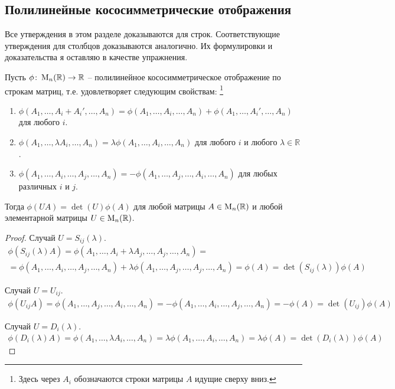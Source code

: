 \subsection{Полилинейные кососимметрические отображения}
\label{section::DetPolyLinear}

Все утверждения в этом разделе доказываются для строк.
Соответствующие утверждения для столбцов доказываются аналогично.
Их формулировки и доказательства я оставляю в качестве упражнения.

\begin{claim}
\label{claim::PolyAntiAndElementary}
Пусть $\phi\colon \operatorname{M}_{n}(\mathbb R)\to \mathbb R$ -- полилинейное кососимметрическое отображение по строкам матриц, т.е. удовлетворяет следующим свойствам:%
\footnote{Здесь через $A_i$ обозначаются строки матрицы $A$ идущие сверху вниз.}
\begin{enumerate}
\item $\phi(A_1,\ldots, A_i + A_i', \ldots, A_n) = \phi(A_1,\ldots, A_i, \ldots, A_n) + \phi(A_1,\ldots,A_i', \ldots, A_n)$ для любого $i$.

\item $\phi(A_1,\ldots, \lambda A_i, \ldots, A_n) = \lambda \phi(A_1,\ldots, A_i, \ldots, A_n)$ для любого $i$ и любого $\lambda\in\mathbb R$.

\item $\phi(A_1,\ldots, A_i, \ldots, A_j, \ldots, A_n) = -\phi(A_1,\ldots, A_j, \ldots, A_i, \ldots, A_n)$ для любых различных $i$ и $j$.
\end{enumerate}
Тогда $\phi(UA) = \det(U)\phi(A)$ для любой матрицы $A\in\operatorname{M}_{n}(\mathbb R)$ и любой элементарной матрицы $U\in\operatorname{M}_{n}(\mathbb R)$.
\end{claim}
\begin{proof}
Случай $U = S_{ij}(\lambda)$.
\begin{gather*}
\phi(S_{ij}(\lambda)A) = \phi(A_1,\ldots, A_i + \lambda A_j, \ldots, A_j, \ldots, A_n) = \\
= \phi(A_1,\ldots, A_i, \ldots, A_j, \ldots, A_n) + \lambda\phi(A_1,\ldots, A_j, \ldots, A_j, \ldots, A_n) =  \phi(A) = \det(S_{ij}(\lambda))\phi(A)
\end{gather*}

Случай $U= U_{ij}$.
\begin{gather*}
\phi(U_{ij}A) = \phi(A_1,\ldots, A_j, \ldots, A_i, \ldots, A_n) = -\phi(A_1,\ldots, A_i, \ldots, A_j, \ldots, A_n) = -\phi(A) = \det(U_{ij})\phi(A)
\end{gather*}

Случай $U=D_i(\lambda)$.
\begin{gather*}
\phi(D_i(\lambda)A) = \phi(A_1,\ldots,\lambda A_i,\ldots, A_n) = \lambda \phi(A_1,\ldots, A_i,\ldots, A_n) = \lambda \phi(A) = \det(D_i(\lambda))\phi(A)
\end{gather*}
\end{proof}

